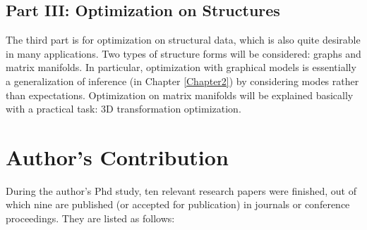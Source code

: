 \subsection{Part III: Optimization on Structures}
The third part is for optimization on structural data, which is also quite desirable in many applications. Two types of structure forms will be considered: graphs and matrix manifolds.         
In particular, optimization with graphical models is essentially a generalization of inference (in Chapter \ref{Chapter2}) by considering modes rather than expectations.            
Optimization on matrix manifolds will be explained basically with a practical task: 3D transformation optimization.      


\section{Author's Contribution}
\label{sec:contribution}
During the author's  Phd study, ten relevant research papers were finished, out of which nine are published (or accepted for publication) in 
journals or conference proceedings. They are listed as follows:     
